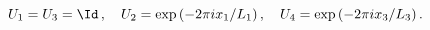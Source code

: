 \begin{equation}
\label{transition}
U_1 = U_3 = \Id \, , \quad U_2 = \exp{(-2 \pi i x_1/L_1)} \, , \quad 
U_4 = \exp{(- 2 \pi i x_3/L_3)} \, .
\end{equation}

